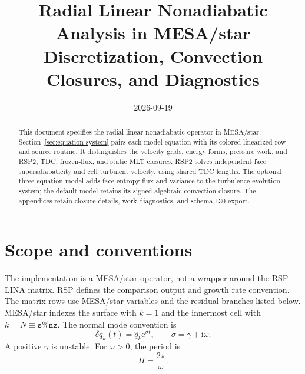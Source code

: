 \documentclass[11pt]{article}
\title{Radial Linear Nonadiabatic Analysis in MESA/star\\
Discretization, Convection Closures, and Diagnostics}
\author{}
\date{2026-09-19}
\newcommand{\e}{\mathrm{e}}
\begin{document}
\maketitle

\begin{abstract}
This document specifies the radial linear nonadiabatic operator in MESA/star.
Section~\ref{sec:equation-system} pairs each model
equation with its colored linearized row and source routine. It distinguishes
the velocity grids, energy forms, pressure work, and RSP2, TDC, frozen-flux,
and static MLT closures. RSP2 solves independent face superadiabaticity and
cell turbulent velocity, using shared TDC lengths. The optional three equation
model adds face entropy flux and variance to the turbulence evolution system;
the default model retains its signed algebraic convection closure.
The appendices retain closure details, work diagnostics, and schema 130 export.
\end{abstract}

\begingroup
\small
\tableofcontents
\endgroup
\clearpage

\section{Scope and conventions}

The implementation is a MESA/star operator, not a wrapper around the RSP LINA
matrix.  RSP defines the comparison output and growth rate convention.  The
matrix rows use MESA/star variables and the residual branches listed below.
MESA/star indexes the surface with $k=1$ and the innermost cell with
$k=N\equiv\texttt{s\%nz}$.  The normal mode convention is
\begin{equation}
  \delta q_k(t)=\widehat{q}_k\e^{\sigma t},
  \qquad \sigma=\gamma+\mathrm{i}\omega .
\end{equation}
A positive $\gamma$ is unstable.  For $\omega>0$, the period is
\begin{equation}
  \Pi=\frac{2\pi}{\omega}.
\end{equation}
\end{document}
